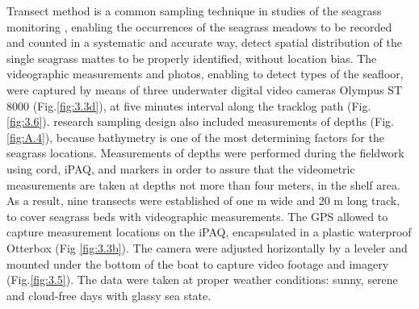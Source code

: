 \documentclass[11pt]{article}
\begin{document}
Transect method is a common sampling technique in studies of the seagrass monitoring \cite{Shortis07}\label{Shortis07},
enabling the occurrences of the seagrass meadows to be recorded and counted in a systematic and
accurate way, detect spatial distribution of the single seagrass mattes to be properly identified,
without location bias. 
The videographic measurements and photos, enabling to detect types of the
seafloor, were captured by means of three underwater digital video cameras \ac{Olympus ST} 8000  (Fig.\ref{fig:3.3d}), at
five minutes interval along the tracklog path (Fig.\ref{fig:3.6}).
research sampling design also included measurements of depths (Fig. \ref{fig:A.4}), because bathymetry is one of the
most determining factors for the seagrass locations. Measurements of depths were performed during
the fieldwork using cord, \ac{iPAQ}, and markers in order to assure that the videometric measurements
are taken at depths not more than four meters, in the shelf area.
As a result, nine transects were established of one m wide and 20 m long track, to cover seagrass beds
with videographic measurements. The \ac{GPS} allowed to capture measurement locations on the \ac{iPAQ},
encapsulated in a plastic waterproof Otterbox (Fig \ref{fig:3.3b}). The camera were adjusted horizontally by a leveler and
 mounted under the bottom of the boat to capture video footage and imagery (Fig.\ref{fig:3.5}). The data
were taken at proper weather conditions: sunny, serene and cloud-free days with glassy sea state. 
\end{document}
